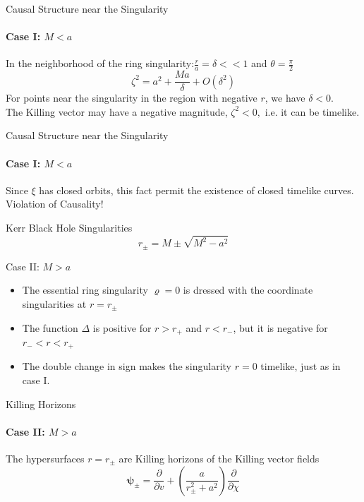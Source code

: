 \documentclass{beamer}
\begin{document}
        \begin{frame}{Causal Structure near the Singularity}
         \framesubtitle{Case I: $M<a$}
            In the neighborhood of the ring singularity:$\frac{r}{a}=\delta<<1$
and $\theta=\frac{\pi}{2}$
			\pause
			$$\zeta^{2}=a^{2}+\frac{Ma}{\delta}+O\left(\delta^{2}\right)$$
            \pause
            For points near the singularity in the region with negative
$r$, we have $\delta<0$.\\
			\pause
			The Killing vector may have a negative magnitude, $\zeta^{2}<0,$ i.e. it can be timelike.\\
        \end{frame}
        
        \begin{frame}{Causal Structure near the Singularity}
         \framesubtitle{Case I: $M<a$}
            Since $\xi$ has closed orbits, this fact permit the existence of closed timelike curves.\\
            \pause
            Violation of Causality!
        \end{frame}
        
        \begin{frame}{Kerr Black Hole Singularities}
            $$r_{\pm}=M\pm\sqrt{M^{2}-a^{2}}$$
    	\end{frame}
       
        \begin{frame}{Case II: $M>a$}
            \begin{itemize}
            \item The essential ring singularity $\varrho=0$ is dressed
with the coordinate singularities at $r=r_{\pm}$ 
            \pause
            \item The function $\Delta$ is positive for $r>r_{+}$ and $r<r_{-}$, but it is negative for $r_{-}<r<r_{+}$ 
            \pause
            \item The double change in sign makes the singularity $r=0$ timelike, just as in case I.
            \end{itemize}
        \end{frame}
        
        \begin{frame}{Killing Horizons}
         \framesubtitle{Case II: $M>a$}
            The hypersurfaces $r=r_{\pm}$ are Killing horizons of the Killing vector fields 
			$$\mathbf{\psi_{\pm}}=\frac{\partial}{\partial v}+\left(\frac{a}{r_{\pm}^{2}+a^{2}}\right)\frac{\partial}{\partial\chi}$$
        \end{frame}
        
\end{document}
